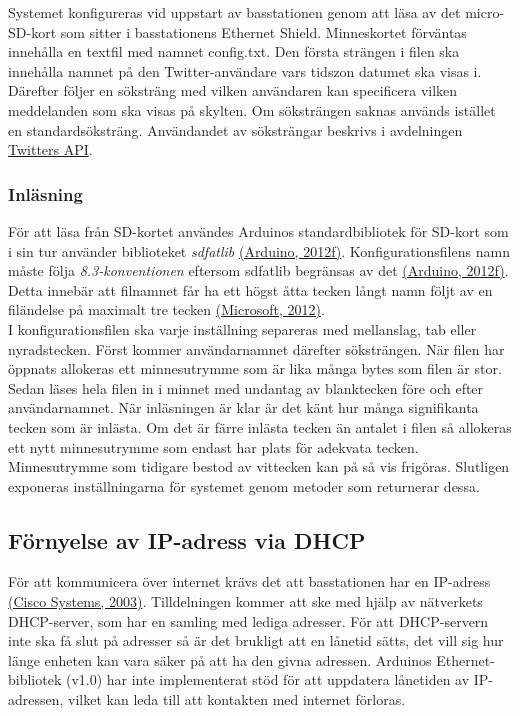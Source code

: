 \documentclass[a4paper,11pt]{article}
\begin{document}
Systemet konfigureras vid uppstart av basstationen genom att läsa av det micro-SD-kort som sitter i basstationens Ethernet Shield. Minneskortet förväntas innehålla en textfil med namnet config.txt. Den första strängen i filen ska innehålla namnet på den Twitter-användare vars tidszon datumet ska visas i. Därefter följer en söksträng med vilken användaren kan specificera vilken meddelanden som ska visas på skylten. Om söksträngen saknas används istället en standardsöksträng. Användandet av söksträngar beskrivs i avdelningen \hyperref[twitterapi]{Twitters API}.


\subsubsection{Inläsning}
För att läsa från SD-kortet användes Arduinos standardbibliotek för SD-kort som i sin tur använder biblioteket {\it sdfatlib} \hyperref[arduino]{(Arduino, 2012f)}. Konfigurationsfilens namn måste följa {\it 8.3-konventionen} eftersom sdfatlib begränsas av det \hyperref[arduino]{(Arduino, 2012f)}. Detta innebär att filnamnet får ha ett högst åtta tecken långt namn följt av en filändelse på maximalt tre tecken \hyperref[microsoft]{(Microsoft, 2012)}.\\

I konfigurationsfilen ska varje inställning separeras med mellanslag, tab eller nyradstecken. Först kommer användarnamnet därefter söksträngen. När filen har öppnats allokeras ett minnesutrymme som är lika många bytes som filen är stor. Sedan läses hela filen in i minnet med undantag av blanktecken före och efter användarnamnet. När inläsningen är klar är det känt hur många signifikanta tecken som är inlästa. Om det är färre inlästa tecken än antalet i filen så allokeras ett nytt minnesutrymme som endast har plats för adekvata tecken. Minnesutrymme som tidigare bestod av vittecken kan på så vis frigöras. Slutligen exponeras inställningarna för systemet genom metoder som returnerar dessa.

\subsection{Förnyelse av IP-adress via DHCP}
För att kommunicera över internet krävs det att basstationen har en IP-adress \hyperref[cisco]{(Cisco Systems, 2003)}. Tilldelningen kommer att ske med hjälp av nätverkets DHCP-server, som har en samling med lediga adresser. För att DHCP-servern inte ska få slut på adresser så är det brukligt att en lånetid sätts, det vill sig hur länge enheten kan vara säker på att ha den givna adressen. Arduinos Ethernet-bibliotek (v1.0) har inte implementerat stöd för att uppdatera lånetiden av IP-adressen, vilket kan leda till att kontakten med internet förloras.\\
\end{document}
